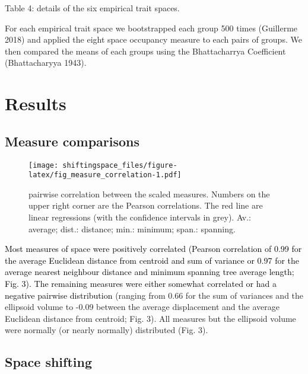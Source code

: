 \documentclass[]{article}
\begin{document}
Table 4: details of the six empirical trait spaces.

\renewcommand\baselinestretch{1.6}\selectfont

For each empirical trait space we bootstrapped each group 500 times
(Guillerme 2018) and applied the eight space occupancy measure to each
pairs of groups. We then compared the means of each groups using the
Bhattacharrya Coefficient (Bhattacharyya 1943).

\section{Results}\label{results}

\subsection{Measure comparisons}\label{measure-comparisons-1}

\renewcommand\baselinestretch{1}\selectfont

\begin{figure}
\centering
\texttt{[image: shiftingspace\_files/figure-latex/fig\_measure\_correlation-1.pdf]}
\caption{pairwise correlation between the scaled measures. Numbers on
the upper right corner are the Pearson correlations. The red line are
linear regressions (with the confidence intervals in grey). Av.:
average; dist.: distance; min.: minimum; span.: spanning.}
\end{figure}

\renewcommand\baselinestretch{1.6}\selectfont

\textcolor{black}{Most measures of space were
positively correlated (Pearson correlation of 0.99 for the average
Euclidean distance from centroid and sum of variance or 0.97 for the
average nearest neighbour distance and minimum spanning tree average
length; Fig. 3). The remaining measures were either somewhat correlated
or had a negative pairwise distribution } (ranging from 0.66 for the
sum of variances and the ellipsoid volume to -0.09 between the average
displacement and the average Euclidean distance from centroid; Fig. 3).
All measures but the ellipsoid volume were normally (or nearly normally)
distributed (Fig. 3).

\subsection{Space shifting}\label{space-shifting}

\renewcommand\baselinestretch{1}\selectfont
\end{document}
